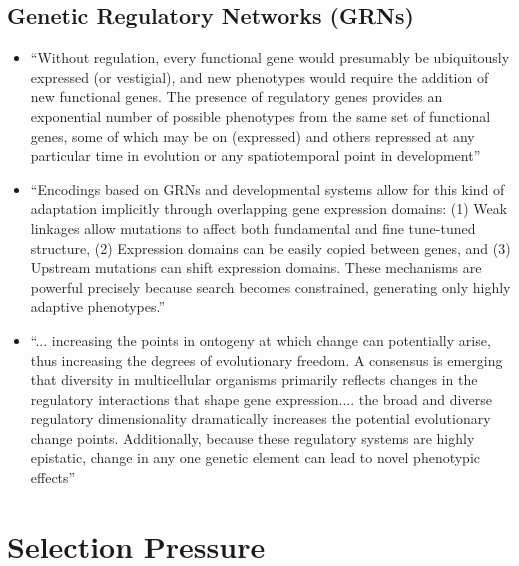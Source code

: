   \subsection{Genetic Regulatory Networks (GRNs)}
  \begin{itemize}
    \item ``Without regulation, every functional gene would presumably be ubiquitously expressed (or vestigial), and new phenotypes would require the addition of new functional genes. The presence of regulatory genes provides an exponential number of possible phenotypes from the same set of functional genes, some of which may be on (expressed) and others repressed at any particular time in evolution or any spatiotemporal point in development'' \cite[p 220]{Downing2015IntelligenceSystems}
    \item ``Encodings based on GRNs and developmental systems allow for this kind of adaptation implicitly through overlapping gene expression domains: (1) Weak linkages allow mutations to affect both fundamental and fine tune-tuned structure, (2) Expression domains can be easily copied between genes, and (3) Upstream mutations can shift expression domains. These mechanisms are powerful precisely because search becomes constrained, generating only highly adaptive phenotypes.'' \cite{Reisinger2007AcquiringRepresentations}
    \item ``... increasing the points in ontogeny at which change can potentially arise, thus increasing the degrees of evolutionary freedom. A consensus is emerging that diversity in multicellular organisms primarily reflects changes in the regulatory interactions that shape gene expression.... the broad and diverse regulatory dimensionality dramatically increases the potential evolutionary change points. Additionally, because these regulatory systems are highly epistatic, change in any one genetic element can lead to novel phenotypic effects'' \cite{Moczek2011TheInnovation}
    \end{itemize}
  
\section{Selection Pressure} 

